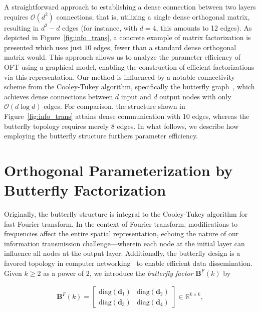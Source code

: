 A straightforward approach to establishing a dense connection between two layers requires $\mathcal{O}(d^2)$ connections, that is, utilizing a single dense orthogonal matrix, resulting in $d^2-d$ edges (for instance, with $d=4$, this amounts to 12 edges). As depicted in Figure~\ref{fig:info_trans}, a concrete example of matrix factorization is presented which uses just $10$ edges, fewer than a standard dense orthogonal matrix would. This approach allows us to analyze the parameter efficiency of OFT using a graphical model, enabling the construction of efficient factorizations via this representation. Our method is influenced by a notable connectivity scheme from the Cooley-Tukey algorithm, specifically the butterfly graph~\cite{cooley1965algorithm}, which achieves dense connections between $d$ input and $d$ output nodes with only $\mathcal{O}(d\log d)$ edges. For comparison, the structure shown in Figure~\ref{fig:info_trans} attains dense communication with $10$ edges, whereas the butterfly topology requires merely $8$ edges. In what follows, we describe how employing the butterfly structure furthers parameter efficiency.

\section{Orthogonal Parameterization by Butterfly Factorization}

Originally, the butterfly structure is integral to the Cooley-Tukey algorithm for fast Fourier transform. In the context of Fourier transform, modifications to frequencies affect the entire spatial representation, echoing the nature of our information transmission challenge—wherein each node at the initial layer can influence all nodes at the output layer. Additionally, the butterfly design is a favored topology in computer networking~\cite{solihin2015fundamentals,li2011linear} to enable efficient data dissemination. Given $k\geq 2$ as a power of $2$, we introduce the \emph{butterfly factor} $\bm{B}^F(k)$ by

\begin{equation}\label{eq:but_factor}
\begin{aligned}
    \bm{B}^F(k)=\begin{bmatrix}
    \text{diag}(\bm{d}_1) & \text{diag}(\bm{d}_2) \\
    \text{diag}(\bm{d}_3) & \text{diag}(\bm{d}_4)
    \end{bmatrix}\in\mathbb{R}^{k\times k},
\end{aligned}
\end{equation}

